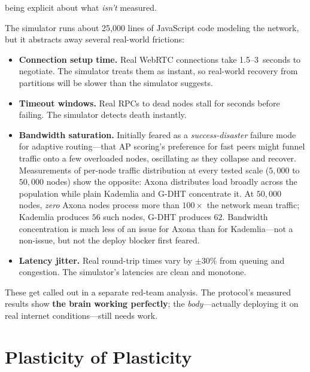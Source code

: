 \documentclass[nobib]{tufte-handout}
\begin{document}
 being explicit about what \emph{isn't} measured.

The simulator runs about 25{,}000 lines of JavaScript code modeling the network, but it abstracts away several real-world frictions:

\begin{itemize}
  \item \textbf{Connection setup time.} Real WebRTC connections take 1.5--3~seconds to negotiate. The simulator treats them as instant, so real-world recovery from partitions will be slower than the simulator suggests.
  \item \textbf{Timeout windows.} Real RPCs to dead nodes stall for seconds before failing. The simulator detects death instantly.
  \item \textbf{Bandwidth saturation.} Initially feared as a \emph{success-disaster} failure mode for adaptive routing---that AP scoring's preference for fast peers might funnel traffic onto a few overloaded nodes, oscillating as they collapse and recover. Measurements of per-node traffic distribution at every tested scale ($5{,}000$ to $50{,}000$ nodes) show the opposite: Axona distributes load broadly across the population while plain Kademlia and G-DHT concentrate it. At $50{,}000$ nodes, \emph{zero} Axona nodes process more than $100\times$ the network mean traffic; Kademlia produces $56$ such nodes, G-DHT produces $62$. Bandwidth concentration is much less of an issue for Axona than for Kademlia---not a non-issue, but not the deploy blocker first feared.
  \item \textbf{Latency jitter.} Real round-trip times vary by $\pm$30\% from queuing and congestion. The simulator's latencies are clean and monotone.
\end{itemize}

These get called out in a separate red-team analysis. The protocol's measured results show \textbf{the brain working perfectly}; the \emph{body}---actually deploying it on real internet conditions---still needs work.

\section{Plasticity of Plasticity}
\end{document}
